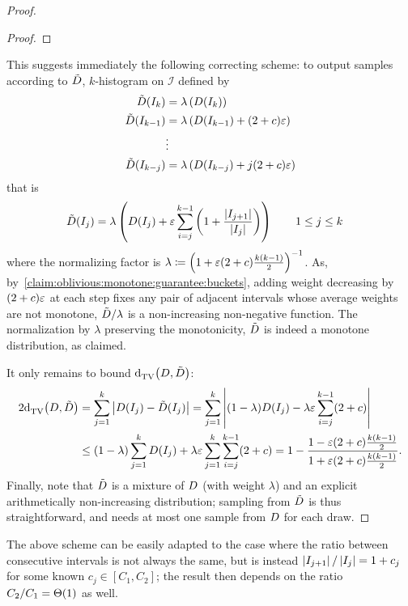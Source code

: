 \begin{proof}
\begin{proof}
    \end{proof}
    This suggests immediately the following correcting scheme: to output samples according to $\tilde{D}$, $k$-histogram on $\mathcal{I}$ defined by
    \begin{align*}
      \tilde{D}(I_k) &= \lambda\left( D(I_k)  \right) \\ 
      \tilde{D}(I_{k-1}) &= \lambda\left( D(I_{k-1}) + (2+c)\varepsilon  \right) \\ 
      &\vdots\\
      \tilde{D}(I_{k-j}) &= \lambda\left( D(I_{k-j}) + j(2+c)\varepsilon  \right) \\ 
    \end{align*}
    that is
    \begin{align*}
      \tilde{D}(I_j) &= \lambda\left( D(I_j) + \varepsilon\sum_{i=j}^{k-1}\left(1+\frac{\left\lvert I_{j+1} \right\rvert}{\left\lvert I_j \right\rvert}\right)  \right) \qquad 1\leq j\leq k
    \end{align*}
    where the normalizing factor is $\lambda\coloneqq \left( 1+\varepsilon(2+c)\frac{k(k-1)}{2} \right)^{-1}$. As, 
    by~\cref{claim:oblivious:monotone:guarantee:buckets}, 
    adding weight decreasing by $(2+c)\varepsilon$ at each step fixes any pair of adjacent intervals
    whose average weights are not monotone,
    $\tilde{D}/\lambda$ is a non-increasing non-negative function. The normalization by $\lambda$ preserving the monotonicity, $\tilde{D}$ is indeed a monotone distribution, as claimed.

    \noindent It only remains to bound ${\operatorname{d}_{\textrm{TV}}^{}\!\left({D, \tilde{D}}\right)}$:
    \begin{align*}
      2{\operatorname{d}_{\textrm{TV}}^{}\!\left({D, \tilde{D}}\right)} &= \sum_{j=1}^{k} \left\lvert  D(I_j) - \tilde{D}(I_j)  \right\rvert = \sum_{j=1}^{k} \left\lvert  (1-\lambda)D(I_j) - \lambda\varepsilon \sum_{i=j}^{k-1} (2+c)  \right\rvert \\
      &\leq (1-\lambda)\sum_{j=1}^{k} D(I_j) + \lambda\varepsilon \sum_{j=1}^{k}\sum_{i=j}^{k-1}(2+c) = 1-\frac{1-\varepsilon(2+c)\frac{k(k-1)}{2}}{1+\varepsilon(2+c)\frac{k(k-1)}{2}  }.
    \end{align*}
    Finally, note that $\tilde{D}$ is a mixture of $D$ (with weight $\lambda$) and an explicit arithmetically non-increasing distribution; sampling from $\tilde{D}$ is thus straightforward, and needs at most one sample from $D$ for each draw.
    \end{proof}
    \begin{remark}
    The above scheme can be easily adapted to the case where the ratio between consecutive intervals is not always the same, but is instead $\left\lvert I_{j+1} \right\rvert/\left\lvert I_j \right\rvert = 1+c_j$ for some known $c_j\in[C_1,C_2]$; the result 
    then depends on the ratio  $C_2/C_1=\bigTheta{1}$ as well.
    \end{remark}

